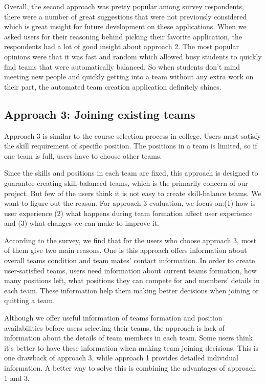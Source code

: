 \documentclass[conference]{IEEEtran}
\begin{document}
Overall, the second approach was pretty popular among survey respondents, there were a number of great suggestions that were not previously considered which is great insight for future development on these applications. When we asked users for their reasoning behind picking their favorite application, the respondents had a lot of good insight about approach 2. The most popular opinions were that it was fast and random which allowed busy students to quickly find teams that were automatically balanced. So when students don't mind meeting new people and quickly getting into a team without any extra work on their part, the automated team creation application definitely shines. 

\subsection{Approach 3: Joining existing teams}
Approach 3 is similar to the course selection process in college. Users must satisfy the skill requirement of specific position. The positions in a team is limited, so if one team is full, users have to choose other teams. 

Since the skills and positions in each team are fixed, this approach is designed to guarantee creating skill-balanced teams, which is the primarily concern of our project. But few of the users think it is not easy to create skill-balance teams. We want to figure out the reason. For approach 3 evaluation, we focus on:(1) how is user experience (2) what happens during team formation affect user experience and (3) what changes we can make to improve it.

According to the survey, we find that for the users who choose approach 3, most of them give two main reasons. One is this approach offers information about overall teams condition and team mates' contact information. In order to create user-satisfied teams, users need information about current teams formation, how many positions left, what positions they can compete for and members' details in each team. These information help them making better decisions when joining or quitting a team. 

Although we offer useful information of teams formation and position availabilities before users selecting their teams, the approach is lack of information about the details of team members in each team. Some users think it's better to have these information when making team joining decisions. This is one drawback of approach 3, while approach 1 provides detailed individual information. A better way to solve this is combining the advantages of approach 1 and 3.
\end{document}
